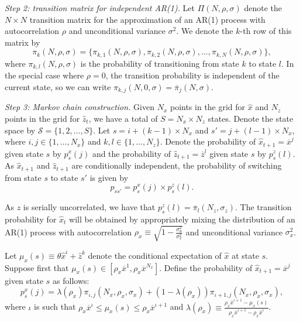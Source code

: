 \textit{Step 2: transition matrix for independent AR(1).} 
Let $\Pi(N, \rho, \sigma)$ denote the $N\times N$ transition matrix for the \citet{rouwenhurst1995asset} approximation of an AR(1) process with autocorrelation $\rho$ and unconditional variance $\sigma^2$. We denote the $k$-th row of this matrix by 
\begin{equation}
    \pi_k(N, \rho, \sigma) = \{\pi_{k,1}(N, \rho, \sigma), \pi_{k,2}(N, \rho, \sigma), \ldots, \pi_{k,N}(N, \rho, \sigma)\},
\end{equation}
where $\pi_{k,l}(N, \rho, \sigma)$ is the probability of transitioning from state $k$ to state $l$. In the special case where $\rho = 0$, the transition probability is independent of the current state, so we can write $\pi_{k,j}(N,0,\sigma) = \overline{\pi}_j(N,\sigma)$.


\textit{Step 3: Markov chain  construction.} Given $N_x$ points in the grid for $\hat{x}$ and $N_{z}$ points in the grid for $\hat{z}_t$, we have a total of $S = N_x \times N_z$ states. Denote the state space by $\mathcal{S} = \{1,2, \ldots, S\}$. Let $s = i + (k-1) \times N_x$ and $s' = j + (l-1) \times N_x$, where $i, j \in \{1, \ldots, N_x\}$ and $k, l \in \{1, \ldots, N_z\}$. 
Denote the probability of $\hat{x}_{t+1} = \overline{x}^{j}$ given state $s$ by $p_s^x(j)$ and the probability of $\hat{z}_{t+1} = \overline{z}^{l}$ given state $s$ by $p_{s}^z(l)$. 
As $\hat{x}_{t+1}$ and $\hat{z}_{t+1}$ are conditionally independent, the probability of switching from state $s$ to state $s'$ is given by 
\begin{equation}
    p_{ss'} = p_s^x(j) \times p_s^{z}(l).
\end{equation}

As $z$ is serially uncorrelated, we have that $p_{s}^z(l) = \overline{\pi}_l(N_z, \sigma_z)$.
The transition probability for $\hat{x}_t$ will be obtained by appropriately mixing the distribution of an AR(1) process with autocorrelation $\rho_{x} \equiv \sqrt{1 - \frac{\sigma_u^2}{\sigma_x^2}}$ and unconditional variance $\sigma_x^2$.

Let $\mu_x(s) \equiv \theta \hat{x}^{i} + \hat{z}^{k}$ denote the conditional expectation of $\hat{x}$ at state $s$. Suppose first that $\mu_x(s) \in [ \rho_x \overline{x}^1, \rho_x \overline{x}^{N_x} ]$. Define the probability of $\hat{x}_{t+1} = \overline{x}^{j}$ given state $s$ as follows:
\begin{equation}
p_s^x(j)  = \lambda(\rho_x) \pi_{\iota,j}(N_x, \rho_x, \sigma_x) + (1-\lambda(\rho_x)) \pi_{\iota+1,j}(N_x, \rho_x, \sigma_x),
\end{equation}
where $\iota$ is such that  $\rho_{x} \overline{x}^\iota \leq \mu_x(s) \leq \rho_x \overline{x}^{\iota+1}$ and $\lambda(\rho_x) \equiv \frac{\rho_{x} \overline{x}^{\iota+1} - \mu_x(s)}{\rho_{x} \overline{x}^{\iota+1}-\rho_{x} \overline{x}^\iota}$.

